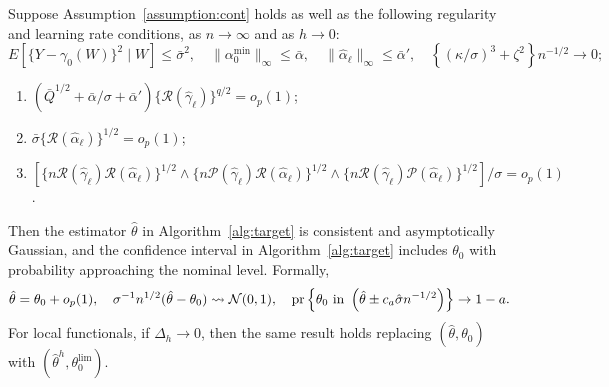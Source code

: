 \begin{corollary}\label{cor:CI}
Suppose Assumption~\ref{assumption:cont} holds as well as the following regularity and learning rate conditions, as $n\rightarrow \infty$ and as $h\rightarrow 0$:
$$
E[\{Y-\gamma_0(W)\}^2 \mid W]\leq \bar{\sigma}^2,\quad \|\alpha^{\min}_0\|_{\infty}\leq\bar{\alpha},\quad  \|\hat{\alpha}_{\ell}\|_{\infty}\leq\bar{\alpha}', \quad  \left\{\left(\kappa/\sigma\right)^3+\zeta^2\right\}n^{-1/2}\rightarrow0;
$$  
\begin{enumerate}
    \item $\left(\bar{Q}^{1/2}+\bar{\alpha}/\sigma+\bar{\alpha}'\right)\{\mathcal{R}(\hat{\gamma}_{\ell})\}^{q/2}=o_p(1)$;
    \item $\bar{\sigma}\{\mathcal{R}(\hat{\alpha}_{\ell})\}^{1/2}=o_p(1)$;
    \item $[\{n \mathcal{R}(\hat{\gamma}_{\ell}) \mathcal{R}(\hat{\alpha}_{\ell})\}^{1/2} \wedge \{n\mathcal{P}(\hat{\gamma}_{\ell})\mathcal{R}(\hat{\alpha}_{\ell})\}^{1/2} \wedge \{n\mathcal{R}(\hat{\gamma}_{\ell})\mathcal{P}(\hat{\alpha}_{\ell})\}^{1/2}]/\sigma =o_p(1)$.
\end{enumerate}
Then the estimator $\hat{\theta}$ in Algorithm~\ref{alg:target} is consistent and asymptotically Gaussian, and the confidence interval in Algorithm~\ref{alg:target} includes $\theta_0$ with probability approaching the nominal level. Formally,
$$
\hat{\theta}=\theta_0+o_p(1),\quad \sigma^{-1}n^{1/2}(\hat{\theta}-\theta_0)\leadsto\mathcal{N}(0,1),\quad \text{\normalfont pr} \left\{\theta_0 \text{ in }  \left(\hat{\theta}\pm c_a\hat{\sigma} n^{-1/2} \right)\right\}\rightarrow 1-a.
$$
For local functionals, if $\Delta_h \rightarrow 0$, then the same result holds replacing $(\hat{\theta},\theta_0)$ with $(\hat{\theta}^h,\theta_0^{\lim})$.
\end{corollary}